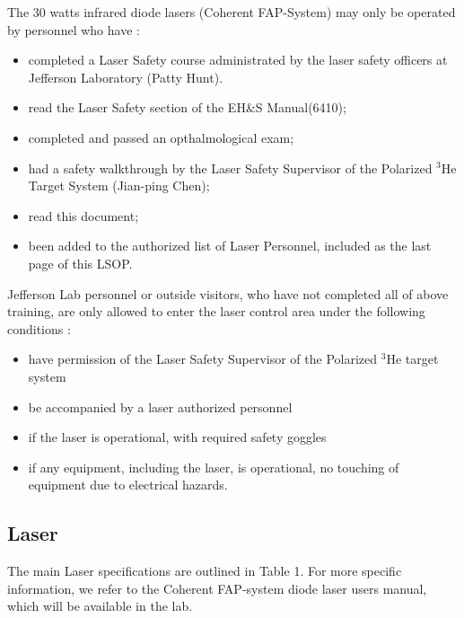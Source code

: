The 30 watts infrared diode lasers (Coherent FAP-System) may only be operated by
personnel who have :
\begin {itemize}
\item completed a Laser Safety course administrated by the laser safety officers at
Jefferson Laboratory (Patty Hunt).
\item read the Laser Safety section of the EH\&S Manual(6410);
\item  completed and passed an opthalmological exam;
\item had a safety walkthrough by the Laser Safety Supervisor of the 
Polarized $^3$He Target System (Jian-ping Chen);
\item read this document;
\item been added to the authorized list of Laser Personnel, included as the 
last page of this LSOP.
\end {itemize}
Jefferson Lab personnel or outside visitors, who have not completed all of 
above training, are
only allowed to enter the laser control area under the following conditions :
\begin {itemize}
\item have permission of the Laser Safety
Supervisor of the Polarized $^3$He target system
\item be accompanied by a laser authorized personnel
\item if the laser is operational, with required safety
goggles
\item if any equipment, including the laser, is operational, no touching of
equipment due to electrical hazards.
\end {itemize}


\subsection{Laser}

The main Laser specifications are outlined in Table 1. For more specific
information, we refer to the Coherent FAP-system diode laser users manual, 
which will be available in the lab.

